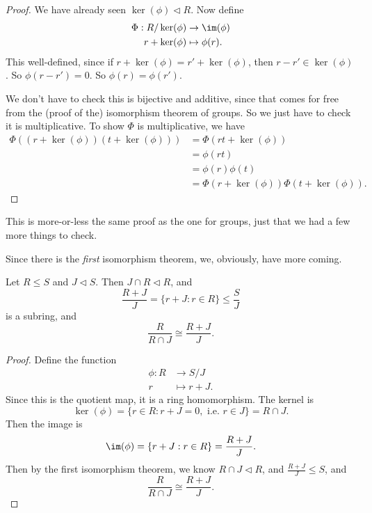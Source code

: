 \documentclass[a4paper]{article}
\begin{document}
\begin{proof}
  We have already seen $\ker(\phi) \lhd R$. Now define
  \begin{align*}
    \Phi: R/\ker(\phi) &\to \im(\phi)\\
    r + \ker(\phi) &\mapsto \phi(r).
  \end{align*}
  This well-defined, since if $r + \ker(\phi) = r' + \ker(\phi)$, then $r - r' \in \ker(\phi)$. So $\phi(r - r') = 0$. So $\phi(r) = \phi(r')$.

  We don't have to check this is bijective and additive, since that comes for free from the (proof of the) isomorphism theorem of groups. So we just have to check it is multiplicative. To show $\Phi$ is multiplicative, we have
  \begin{align*}
    \Phi((r + \ker(\phi))(t + \ker(\phi))) &= \Phi(rt + \ker(\phi)) \\
    &= \phi(rt) \\
    &= \phi(r)\phi(t) \\
    &= \Phi(r + \ker(\phi)) \Phi(t + \ker(\phi)).
  \end{align*}
\end{proof}
This is more-or-less the same proof as the one for groups, just that we had a few more things to check.

Since there is the \emph{first} isomorphism theorem, we, obviously, have more coming.

\begin{thm}
  Let $R \leq S$ and $J \lhd S$. Then $J \cap R \lhd R$, and
  \[
    \frac{R + J}{J} = \{r + J: r \in R\} \leq \frac{S}{J}
  \]
  is a subring, and
  \[
    \frac{R}{R \cap J} \cong \frac{R + J}{J}.
  \]
\end{thm}

\begin{proof}
  Define the function
  \begin{align*}
    \phi: R &\to S/J\\
    r &\mapsto r + J.
  \end{align*}
  Since this is the quotient map, it is a ring homomorphism. The kernel is
  \[
    \ker(\phi) = \{r \in R: r + J = 0,\text{ i.e.\ } r \in J\} = R \cap J.
  \]
  Then the image is
  \[
    \im(\phi) = \{r + J: r \in R\} = \frac{R + J}{J}.
  \]
  Then by the first isomorphism theorem, we know $R \cap J \lhd R$, and $\frac{R + J}{J} \leq S$, and
  \[
    \frac{R}{R \cap J} \cong \frac{R + J}{J}.
  \]
\end{proof}
\end{document}
